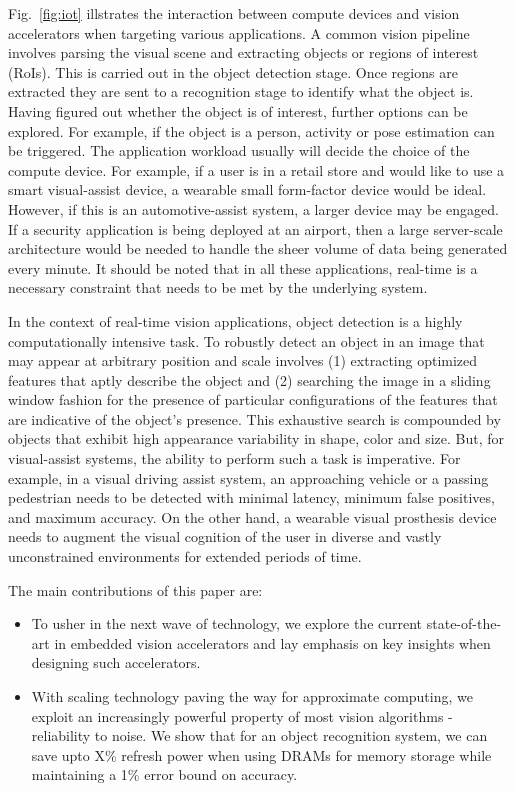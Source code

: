 Fig.~\ref{fig:iot} illstrates the interaction between compute devices and vision accelerators when targeting various applications. A common vision pipeline involves parsing the visual scene and extracting objects or regions of interest (RoIs). This is 
carried out in the object detection stage. Once regions are extracted they are sent to a recognition stage to identify 
what the object is. Having figured out whether the object is of interest, further options can be explored. For example, if the 
object is a person, activity or pose estimation can be triggered. The application workload usually will decide the choice of 
the compute device. For example, if a user is in a retail store and would like to use a smart visual-assist device, a 
wearable small form-factor device would be ideal. However, if this is an automotive-assist system, a larger device may be 
engaged. If a security application is being deployed at an airport, then a large server-scale architecture would be needed to
handle the sheer volume of data being generated every minute. It should be noted that in all these applications, real-time is a necessary constraint that needs to be met by the underlying system.

In the context of real-time vision applications, object detection is a highly computationally intensive task.  
To robustly detect an object
in an image that may appear at arbitrary position and scale involves (1) extracting optimized features that aptly describe the object and (2) 
searching the image in a sliding window fashion for the presence of particular configurations of the features that are indicative of the object's presence. 
This exhaustive search is compounded by objects that exhibit high appearance variability in shape, color and size. 
But, for visual-assist systems, the ability to perform such a task is imperative. For example, in a visual driving
assist system, an approaching vehicle or a passing pedestrian needs to be detected
with minimal latency, minimum false positives, and maximum accuracy. On the other hand, a wearable visual prosthesis device needs to augment the visual cognition of the user 
in diverse and vastly unconstrained environments for extended periods of time.

The main contributions of this paper are:
\begin{itemize}
\item To usher in the next wave of technology, we explore the current state-of-the-art in 
embedded vision accelerators and lay emphasis on key insights when designing such accelerators.
\item With scaling technology paving the way for approximate computing, we exploit an increasingly powerful property of most vision algorithms - reliability to noise. 
We show that for an object recognition system, we can save upto X\% refresh power when using DRAMs for memory storage while maintaining a 1\% error bound on accuracy.
\end{itemize}

